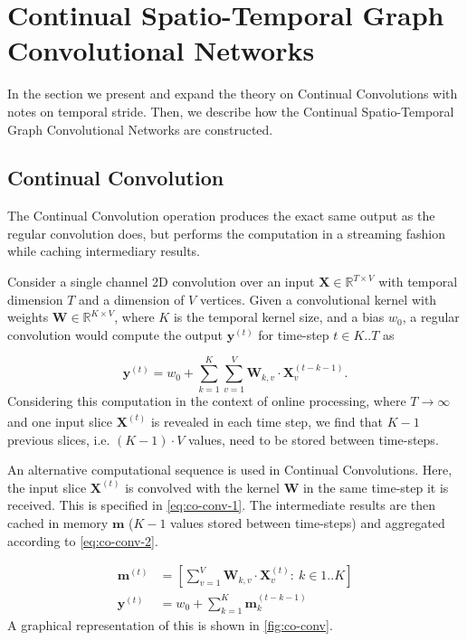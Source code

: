 \documentclass[journal]{IEEEtran}
\theoremstyle{definition}
\begin{document}
\section{Continual Spatio-Temporal Graph Convolutional Networks}\label{sec:continual-st-gcn-Section}
In the section we present and expand the theory on Continual Convolutions with notes on temporal stride. Then, we describe how the Continual Spatio-Temporal Graph Convolutional Networks are constructed.

\subsection{Continual Convolution} \label{sec:conv}
The Continual Convolution operation produces the exact same output as the regular convolution does, but performs the computation in a streaming fashion while caching intermediary results.

Consider a single channel 2D convolution over an input $\mathbf{X} \in \mathbb{R}^{T \times V}$ with temporal dimension $T$ and a dimension of $V$ vertices.
Given a convolutional kernel with weights $\mathbf{W} \in \mathbb{R}^{K \times V}$, where $K$ is the temporal kernel size, and a bias $w_0$, a regular convolution would compute the output $\mathbf{y}^{(t)}$ for time-step $t \in K..T$ as

\begin{equation}
    \label{eq:conv}
    \mathbf{y}^{(t)} = w_0 + \sum_{k = 1}^{K} \sum_{v = 1}^{V} \mathbf{W}_{k,v} \cdot \mathbf{X}_v^{(t-k-1)}.
\end{equation}
Considering this computation in the context of online processing, where $T \xrightarrow[]{} \infty$ and one input slice $\mathbf{X}^{(t)}$ is revealed in each time step, we find that $K-1$ previous slices, i.e. $(K-1) \cdot V$ values, need to be stored between time-steps.

An alternative computational sequence is used in Continual Convolutions. 
Here, the input slice $\mathbf{X}^{(t)}$ is convolved with the kernel $\mathbf{W}$ in the same time-step it is received. This is specified in \cref{eq:co-conv-1}. The intermediate results are then cached in memory $\mathbf{m}$ ($K-1$ values stored between time-steps) and aggregated according to \cref{eq:co-conv-2}.

\begin{subequations}\label{eq:co-conv}
    \begin{align}
        \label{eq:co-conv-1}
        \mathbf{m}^{(t)} &= \left[ 
            \sum_{v = 1}^{V} \mathbf{W}_{k,v} \cdot \mathbf{X}_v^{(t)} : \ k \in 1..K
        \right]
        \\
        \label{eq:co-conv-2}
        \mathbf{y}^{(t)} &= w_0 + \sum_{k = 1}^{K} \mathbf{m}^{(t-k-1)}_k
    \end{align}
\end{subequations}
A graphical representation of this is shown in \cref{fig:co-conv}.
\end{document}
